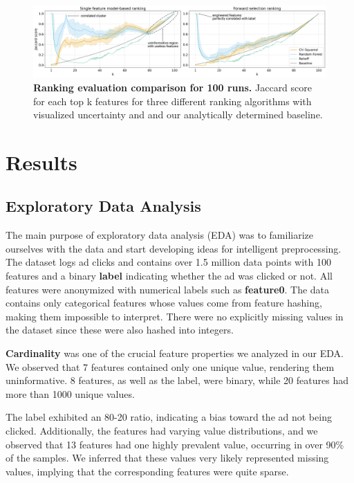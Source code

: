 \documentclass[fleqn,moreauthors,10pt]{ds_report}
\begin{document}
\begin{figure}[!ht]
	\includegraphics[width=\linewidth]{img/ranking_comparison_chosen_annotated.png}
	\caption{\textbf{Ranking evaluation comparison for 100 runs.} Jaccard score for each top k features for three different ranking algorithms with visualized uncertainty and and our analytically determined baseline.}
	\label{fig:evaluation_comparison}
\end{figure}

\section*{Results}

\subsection*{Exploratory Data Analysis}

The main purpose of exploratory data analysis (EDA) was to familiarize ourselves with the data and start developing ideas for intelligent preprocessing. The dataset logs ad clicks and contains over 1.5 million data points with 100 features and a binary \textbf{label} indicating whether the ad was clicked or not. All features were anonymized with numerical labels such as \textbf{feature0}. The data contains only categorical features whose values come from feature hashing, making them impossible to interpret. There were no explicitly missing values in the dataset since these were also hashed into integers.

\textbf{Cardinality} was one of the crucial feature properties we analyzed in our EDA. We observed that 7 features contained only one unique value, rendering them uninformative. 8 features, as well as the label, were binary, while 20 features had more than 1000 unique values.

The label exhibited an 80-20 ratio, indicating a bias toward the ad not being clicked. Additionally, the features had varying value distributions, and we observed that 13 features had one highly prevalent value, occurring in over 90\% of the samples. We inferred that these values very likely represented missing values, implying that the corresponding features were quite sparse.
\end{document}
